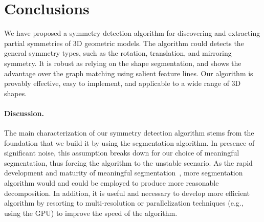 \section{Conclusions}
\label{sec:con}

We have proposed a symmetry detection algorithm for discovering and extracting partial symmetries of 3D geometric models.
The algorithm could detects the general symmetry types, such as the rotation, translation, and mirroring symmetry.
It is robust as relying on the shape segmentation, and shows the advantage over the graph matching using salient feature lines.
Our algorithm is provably effective, easy to implement, and applicable to a wide range of 3D shapes.

\paragraph{Discussion.}
The main characterization of our symmetry detection algorithm stems from the foundation that we build it by using the segmentation algorithm.
In presence of significant noise, this assumption breaks down for our choice of meaningful segmentation,
thus forcing the algorithm to the unstable scenario.
As the rapid development and maturity of meaningful segmentation~\cite{Shamir2008},
more segmentation algorithm would and could be employed to produce more reasonable decomposition.
In addition, it is useful and necessary to develop more efficient algorithm by resorting to multi-resolution or parallelization
techniques (e.g., using the GPU) to improve the speed of the algorithm.
